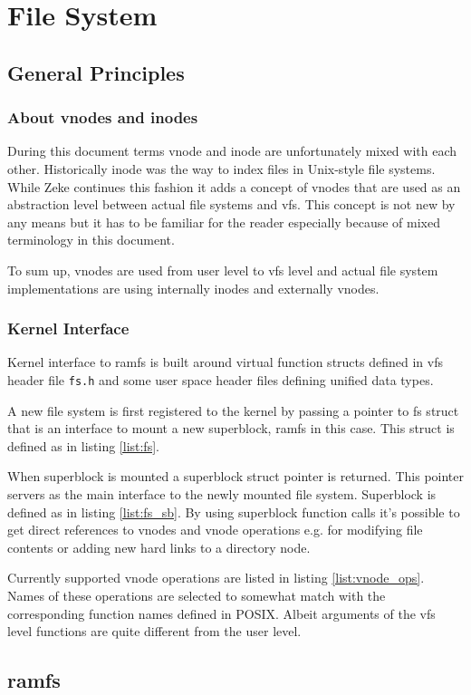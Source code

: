 \part{File System}

\chapter{General Principles}

\section{About vnodes and inodes}

During this document terms \acs{vnode} and \acs{inode} are unfortunately mixed
with each other. Historically inode was the way to index files in Unix-style
file systems.\cite{Wikipedia:inode} While Zeke continues this fashion it adds
a concept of vnodes that are used as an abstraction level between actual file
systems and \acf{vfs}. This concept is not new by any means but it has to be
familiar for the reader especially because of mixed terminology in this
document.

To sum up, vnodes are used from user level to \acs{vfs} level and actual file
system implementations are using internally inodes and externally vnodes.

\section{Kernel Interface}

Kernel interface to ramfs is built around virtual function structs defined in
\acs{vfs} header file \verb+fs.h+ and some user space header files defining
unified data types.

A new file system is first registered to the kernel by passing a pointer to
fs struct that is an interface to mount a new superblock, ramfs in this case.
This struct is defined as in listing \ref{list:fs}.

When superblock is mounted a superblock struct pointer is returned. This pointer
servers as the main interface to the newly mounted file system. Superblock is
defined as in listing \ref{list:fs_sb}. By using superblock function calls it's
possible to get direct references to vnodes and \acs{vnode} operations e.g. for
modifying file contents or adding new hard links to a directory node.




Currently supported vnode operations are listed in listing \ref{list:vnode_ops}.
Names of these operations are selected to somewhat match with the corresponding
function names defined in \acs{POSIX}. Albeit arguments of the \acs{vfs} level
functions are quite different from the user level.



\chapter{ramfs}

